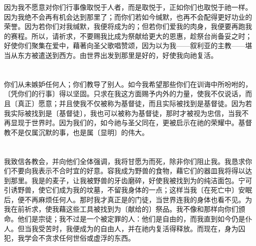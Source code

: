 因为我不愿意对你们行事像取悦于人者，而是取悦于，正如你们也取悦于祂一样。因为我绝不会再有机会达到那里了；而你们若如今缄默，也再不会配得更好功业的荣誉。因为若你们对我缄默，我便将成为的；但若你们爱我的肉身，我便要再跑我的赛程。所以，请祈求，不要赐我比成为祭献给更大的恩惠，趁祭台尚备妥之时；好使你们聚集在爱中，藉著向圣父歌唱赞颂，因为以为我——叙利亚的主教——堪当从东方被遣送到西方。由世界出发到那里是好的，好使我向祂复活。\par


\section{}

你们从未嫉妒任何人；你们教导了别人。如今我希望那些你们在训诲中所吩咐的，〔凭你们的行事〕得以坚固。只求在我这方面赐予内外的力量，使我不仅说话，而且〔真正〕愿意；并且使我不仅被称为基督徒，而且实际被找到是基督徒。因为若我实际被找到是〔基督徒〕，我也可以被称为基督徒，那时才被视为忠信，当我不再显现于世界时。因为我们的，如今祂与圣父同在，更被启示在祂的荣耀中。基督教不是仅属沉默的事，也是属〔显明〕的伟大。\par


\section{}

我致信各教会，并向他们全体强调，我将甘愿为而死，除非你们阻止我。我恳求你们不要向我表示不合时宜的好意。容我成为野兽的食物，藉它们的器皿我将得以达到那里。我是的麦子，让我被野兽的牙齿磨碎，好使我被找到为的纯洁面包。宁可引诱野兽，使它们成为我的坟墓，不留我身体的一点；这样当我〔在死亡中〕安眠后，便不再麻烦任何人。那时我才真正是的门徒，当世界连我的身体也看不见。为我在前祈求，使我藉这些工具被找到为〔献给的〕祭品。我不像和那样向你们颁命。他们是宗徒；我不过是一个被定罪的人：他们是自由的，而我直到如今仍是仆人。但当我受苦时，我便成为的自由人，并在祂内复活得释放。而现在，身为囚犯，我学会不贪求任何世俗或虚浮的东西。\par

